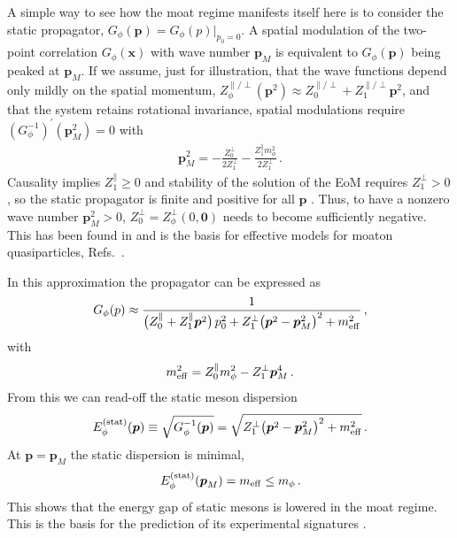 \documentclass[reprint,english,superscriptaddress,preprintnumbers,amsmath,amssymb,aps,prd,nofootinbib]{revtex4-2}
\newcommand{\bs}[1]{\boldsymbol{#1}}
\begin{document}
A simple way to see how the moat regime manifests itself here is to consider the static propagator, $G_\phi(\bs{p}) = G_\phi(p)|_{p_0=0}$. A spatial modulation of the two-point correlation $G_\phi(\bs{x})$ with wave number $\bs{p}_M$ is equivalent to $G_\phi(\bs{p})$ being peaked at $\bs{p}_M$. If we assume, just for illustration, that the wave functions depend only mildly on the spatial momentum, $Z_\phi^{\parallel/\perp}(\bs{p}^2) \approx Z_0^{\parallel/\perp} + Z_1^{\parallel/\perp}\bs{p}^2$, and that the system retains rotational invariance, spatial modulations require $(G_\phi^{-1})^\prime(\bs{p}_M^2) = 0$ with 
\begin{align}\label{eq:pmoat}
    \bs{p}_M^2 = -\frac{Z_0^\perp}{2Z_1^\perp} - \frac{Z_1^\parallel m_\phi^2}{2Z_1^\perp}\,.
\end{align}
Causality implies $Z_1^\parallel \geq 0$ and stability of the solution of the EoM requires $Z_1^\perp > 0$, so the static propagator is finite and positive for all $\bs{p}$ \cite{Weinberg:1987vp}. Thus, to have a nonzero wave number $\bs{p}_M^2 > 0$, $Z_0^\perp = Z_\phi^\perp(0,\bs{0})$ needs to become sufficiently negative. This has been found in \cite{Fu:2019hdw, Koenigstein:2021llr, Pannullo:2024sov} and is the basis for effective models for moaton quasiparticles, Refs.\ \cite{Pisarski:2020dnx, Pisarski:2021qof, Rennecke:2021ovl, Rennecke:2023xhc, Nussinov:2024erh}.

In this approximation the propagator can be expressed as
%
\begin{align}
  G_\phi(p) \approx\frac{1}{\big(Z_0^{\parallel} + Z_1^{\parallel} \bs{p}^2 \big)\, p_0^2 + Z_1^\perp \big(\bs{p}^2 - \bs{p}_M^2\big)^2 + m_{\rm eff}^2}\,,
  \label{eq:Gam2phiphiB}
\end{align}
%
with
\begin{align}\label{eq:meff}
    m_{\rm eff}^2 = Z_0^{\parallel} m_\phi^2 - Z_1^\perp \bs{p}_M^4\,.
\end{align}
From this we can read-off the static meson dispersion
\begin{align}\label{eq:Estat}
    E_\phi^{\rm(stat)}(\bs{p}) \equiv \sqrt{G_\phi^{-1}(\bs{p})} = \sqrt{Z_1^\perp \big(\bs{p}^2 - \bs{p}_M^2\big)^2 + m_{\rm eff}^2}\,. 
\end{align}
At $\bs{p} = \bs{p}_M$ the static dispersion is minimal,
\begin{align}\label{eq:Estat}
   E_\phi^{\rm(stat)}(\bs{p}_M) = m_{\rm eff} \leq m_\phi\,.
\end{align}
This shows that the energy gap of static mesons is lowered in the moat regime. This is the basis for the prediction of its experimental signatures \cite{Pisarski:2020gkx, Pisarski:2021qof, Rennecke:2023xhc, Nussinov:2024erh}.
\end{document}
